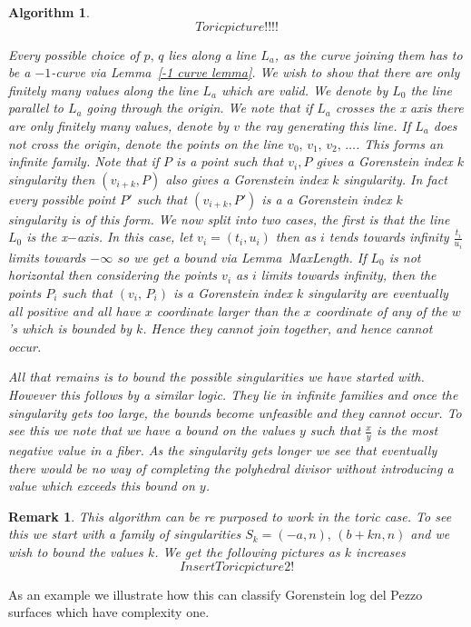 \documentclass[12pt]{amsart}
\theoremstyle{plain}
\newtheorem{algorithm}[thm]{Algorithm}
\newtheorem*{rem}{Remark}
\begin{document}
\begin{algorithm}
\[
Toric picture!!!!
\] 
 
Every possible choice of $p, \, q$ lies along a line $L_a$, as the curve joining them has to be a $-1$-curve via Lemma~\ref{-1 curve lemma}. We wish to show that there are only finitely many values along the line $L_a$ which are valid. We denote by $L_0$ the line parallel to $L_a$ going through the origin. We note that if $L_a$ crosses the x axis there are only finitely many values, denote by $v$ the ray generating this line. If $L_a$ does not cross the origin, denote the points on the line $v_0, \, v_1, \, v_2, \, \dots$. This forms an infinite family. Note that if $P$ is a point such that $v_i, P$ gives a Gorenstein index $k$ singularity then $(v_{i+k}, P )$ also gives a Gorenstein index $k$ singularity. In fact every possible point $P'$ such that $(v_{i+k}, P')$ is a a Gorenstein index $k$ singularity is of this form. We now split into two cases, the first is that the line $L_0$ is the x$-$axis. In this case, let $v_i = (t_i, u_i)$ then as $i$ tends towards infinity $\frac{t_i}{u_i}$ limits towards $-\infty$ so we get a bound via Lemma~{MaxLength}. If $L_0$ is not horizontal then considering the points $v_i$ as $i$ limits towards infinity, then the points $P_i$ such that $(v_i, \, P_i)$ is a Gorenstein index $k$ singularity are eventually all positive and all have $x$ coordinate larger than the $x$ coordinate of any of the $w$'s which is bounded by $k$. Hence they cannot join together, and hence cannot occur. 
 
All that remains is to bound the possible singularities we have started with. However this follows by a similar logic. They lie in infinite families and once the singularity gets too large, the bounds become unfeasible and they cannot occur. To see this we note that we have a bound on the values $y$ such that $\frac{x}{y}$ is the most negative value in a fiber. As the singularity gets longer we see that eventually there would be no way of completing the polyhedral divisor without introducing a value which exceeds this bound on $y$. 
\end{algorithm}

\begin{rem}
This algorithm can be re purposed to work in the toric case. To see this we start with a family of singularities $ S_k = (-a, n), \, (b+kn, n)$ and we wish to bound the values $k$. We get the following pictures as $k$ increases
\[
Insert Toric picture 2!
\] 
\end{rem}

As an example we illustrate how this can classify Gorenstein log del Pezzo surfaces which have complexity one.
\end{document}
